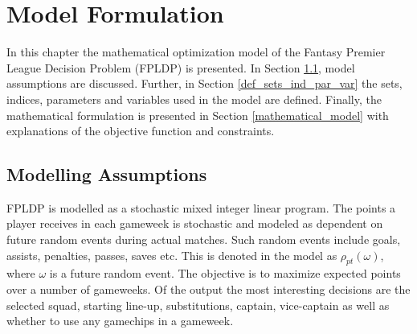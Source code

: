 
\chapter{Model Formulation} \label{chapter_model_formulation}

In this chapter the mathematical optimization model of the Fantasy Premier League Decision Problem (FPLDP) is presented. In Section \ref{modelling_choices},  model assumptions are discussed. Further, in Section \ref{def_sets_ind_par_var} the sets, indices, parameters and variables used in the model are defined. Finally, the mathematical formulation is presented in Section \ref{mathematical_model} with explanations of the objective function and constraints. 


\section{Modelling Assumptions} \label{modelling_choices}

\begin{comment}
As mentioned in Section \ref{Other_Relevant_Research}, the FPLDP resembles the classic Knapsack problem. In the Knapsack problem, there is a range of items with a value and cost, and the goal is to maximize the total value meanwhile not surpass a budget. Whereas in this case there are players where their value is points and their cost is an amount predetermined by the game. The aim is to pick players such as the total amount of points is maximized while the budget is held in each gameweek. In addition, there are constraints that handle the choices of substitutes, captain and vice-captain each gameweek. The decisions on wildcard, bench boost, free hit and triple captain are also modelled. 

\end{comment}


\newpar

FPLDP is modelled as a stochastic mixed integer linear program. The points a player receives in each gameweek is stochastic and modeled as dependent on future random events during actual matches. Such random events include goals, assists, penalties, passes, saves etc. This is denoted in the model as $\rho_{pt}(\omega)$, where $\omega$ is a future random event. The objective is to maximize expected points over a number of gameweeks. Of the output the most interesting decisions are the selected squad, starting line-up, substitutions, captain, vice-captain as well as whether to use any gamechips in a gameweek. 

